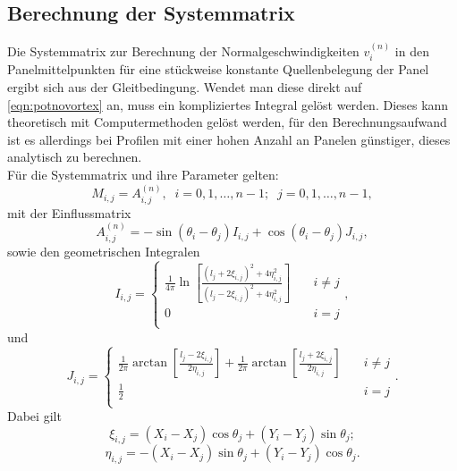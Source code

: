 \subsection{Berechnung der Systemmatrix}
\label{chap:systemmatrixtheory}
Die Systemmatrix zur Berechnung der Normalgeschwindigkeiten $v_i^{(n)}$ in den Panelmittelpunkten für eine stückweise konstante Quellenbelegung der Panel ergibt sich aus der Gleitbedingung. Wendet man diese direkt auf \eqref{eqn:potnovortex} an, muss ein kompliziertes Integral gelöst werden. Dieses kann theoretisch mit Computermethoden gelöst werden, für den Berechnungsaufwand ist es allerdings bei Profilen mit einer hohen Anzahl an Panelen günstiger, dieses analytisch zu berechnen. \\
Für die Systemmatrix und ihre Parameter gelten:
\begin{equation}
\label{eq:mnovortex}
M_{i,j} = A_{i,j}^{(n)}, \;\; i = 0, 1, \ldots , n-1; \;\; j = 0,1,\ldots , n-1,
\end{equation}
mit der Einflussmatrix
\begin{equation}
\label{eq:An}
A_{i,j}^{(n)} = -\sin {(\theta _i - \theta _j)} I_{i,j} + \cos{(\theta _i - \theta _j)} J_{i,j},
\end{equation}
sowie den geometrischen Integralen
\begin{equation}
I_{i,j} = 
     \begin{cases}
       \frac{1}{4\pi } \ln \left[ \frac{(l_j + 2 \xi_{i,j})^2 + 4 \eta_{i,j}^2}{(l_j -2 \xi _{i,j})^2 + 4 \eta_{i,j}^2} \right] &\quad i \neq j \\
       0 &\quad i = j \\
     \end{cases},
\end{equation}
und
\begin{equation}
J_{i,j} = 
     \begin{cases}
       \frac{1}{2\pi } \arctan \left[ \frac{l_j - 2 \xi_{i,j}}{2 \eta_{i,j}} \right] + \frac{1}{2\pi } \arctan \left[ \frac{l_j + 2 \xi_{i,j}}{2 \eta_{i,j}} \right] &\quad i \neq j \\
       \frac{1}{2} &\quad i = j \\
     \end{cases}.
\end{equation}
Dabei gilt
\begin{equation}
\label{eq:xi}
\xi_{i,j} =  (X_i - X_j) \cos \theta _j + (Y_i - Y_j) \sin \theta _j;
\end{equation}
\begin{equation}
\label{eq:eta}
\eta_{i,j} =  -(X_i - X_j) \sin \theta _j + (Y_i - Y_j) \cos \theta _j.
\end{equation}
